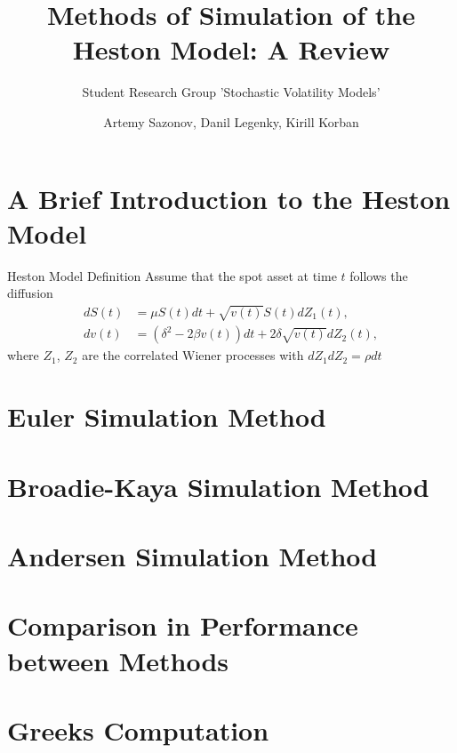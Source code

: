 \documentclass{vegapresentation}
\subtitle{Student Research Group 'Stochastic Volatility Models'}
\title{Methods of Simulation of the Heston Model: A Review}
\author{Artemy Sazonov, Danil Legenky, Kirill Korban}
\institute{Lomonosov Moscow State Univesity, Faculty of Mechanics and Mathematics}
\begin{document}
    \begin{frame}
        \maketitle
    \end{frame}

    \section{A Brief Introduction to the Heston Model}
        \begin{frame}{Heston Model Definition}
            Assume that the spot asset at time $t$ follows the diffusion
            \begin{align}
                dS(t) & = \mu S(t)dt + \sqrt{v(t)} S(t) dZ_1(t), \label{Heston:price}\\
                dv(t) & = \left(\delta^2 - 2\beta v(t)\right) dt + 2\delta \sqrt{v(t)} dZ_2(t), \label{Heston:variance}
            \end{align}
            where $Z_1$, $Z_2$ are the correlated Wiener processes with $dZ_1dZ_2 = \rho dt$
        \end{frame}

    \section{Euler Simulation Method}
        

    \section{Broadie-Kaya Simulation Method} 
        

    \section{Andersen Simulation Method}
        

    \section{Comparison in Performance between Methods}

    \section{Greeks Computation}
    
\end{document}

